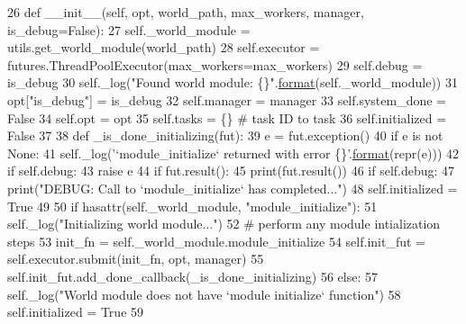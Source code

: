 \begin{DoxyCode}
26     \textcolor{keyword}{def }\_\_init\_\_(self, opt, world\_path, max\_workers, manager, is\_debug=False):
27         self.\_world\_module = utils.get\_world\_module(world\_path)
28         self.executor = futures.ThreadPoolExecutor(max\_workers=max\_workers)
29         self.debug = is\_debug
30         self.\_log(\textcolor{stringliteral}{"Found world module: \{\}"}.\hyperlink{namespaceparlai_1_1chat__service_1_1services_1_1messenger_1_1shared__utils_a32e2e2022b824fbaf80c747160b52a76}{format}(self.\_world\_module))
31         opt[\textcolor{stringliteral}{"is\_debug"}] = is\_debug
32         self.manager = manager
33         self.system\_done = \textcolor{keyword}{False}
34         self.opt = opt
35         self.tasks = \{\}  \textcolor{comment}{# task ID to task}
36         self.initialized = \textcolor{keyword}{False}
37 
38         \textcolor{keyword}{def }\_is\_done\_initializing(fut):
39             e = fut.exception()
40             \textcolor{keywordflow}{if} e \textcolor{keywordflow}{is} \textcolor{keywordflow}{not} \textcolor{keywordtype}{None}:
41                 self.\_log(\textcolor{stringliteral}{'`module\_initialize` returned with error \{\}'}.\hyperlink{namespaceparlai_1_1chat__service_1_1services_1_1messenger_1_1shared__utils_a32e2e2022b824fbaf80c747160b52a76}{format}(repr(e)))
42                 \textcolor{keywordflow}{if} self.debug:
43                     \textcolor{keywordflow}{raise} e
44             \textcolor{keywordflow}{if} fut.result():
45                 print(fut.result())
46             \textcolor{keywordflow}{if} self.debug:
47                 print(\textcolor{stringliteral}{"DEBUG: Call to `module\_initialize` has completed..."})
48             self.initialized = \textcolor{keyword}{True}
49 
50         \textcolor{keywordflow}{if} hasattr(self.\_world\_module, \textcolor{stringliteral}{"module\_initialize"}):
51             self.\_log(\textcolor{stringliteral}{"Initializing world module..."})
52             \textcolor{comment}{# perform any module intialization steps}
53             init\_fn = self.\_world\_module.module\_initialize
54             self.init\_fut = self.executor.submit(init\_fn, opt, manager)
55             self.init\_fut.add\_done\_callback(\_is\_done\_initializing)
56         \textcolor{keywordflow}{else}:
57             self.\_log(\textcolor{stringliteral}{"World module does not have `module initialize` function"})
58             self.initialized = \textcolor{keyword}{True}
59 
\end{DoxyCode}


